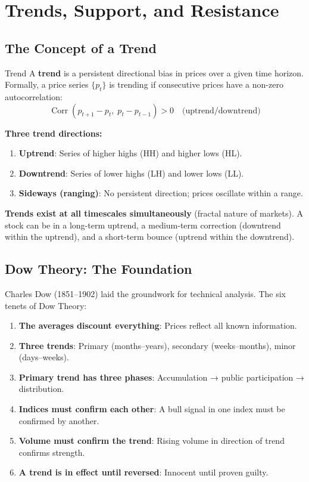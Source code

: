 \documentclass[12pt,a4paper,openany]{report}
\theoremstyle{definition}
\newcommand{\Corr}{\operatorname{Corr}}
\begin{document}

\chapter{Trends, Support, and Resistance}

\section{The Concept of a Trend}

\begin{definitionbox}{Trend}
A \textbf{trend} is a persistent directional bias in prices over a given time horizon. Formally, a price series $\{p_t\}$ is trending if consecutive prices have a non-zero autocorrelation:
\[
  \Corr(p_{t+1} - p_t,\; p_t - p_{t-1}) > 0 \quad \text{(uptrend/downtrend)}
\]
\end{definitionbox}

\noindent\textbf{Three trend directions:}
\begin{enumerate}[label=\arabic*.]
  \item \textbf{Uptrend}: Series of higher highs (HH) and higher lows (HL).
  \item \textbf{Downtrend}: Series of lower highs (LH) and lower lows (LL).
  \item \textbf{Sideways (ranging)}: No persistent direction; prices oscillate within a range.
\end{enumerate}

\textbf{Trends exist at all timescales simultaneously} (fractal nature of markets). A stock can be in a long-term uptrend, a medium-term correction (downtrend within the uptrend), and a short-term bounce (uptrend within the downtrend).

\section{Dow Theory: The Foundation}

Charles Dow (1851--1902) laid the groundwork for technical analysis. The six tenets of Dow Theory:
\begin{enumerate}[label=\arabic*.]
  \item \textbf{The averages discount everything}: Prices reflect all known information.
  \item \textbf{Three trends}: Primary (months--years), secondary (weeks--months), minor (days--weeks).
  \item \textbf{Primary trend has three phases}: Accumulation → public participation → distribution.
  \item \textbf{Indices must confirm each other}: A bull signal in one index must be confirmed by another.
  \item \textbf{Volume must confirm the trend}: Rising volume in direction of trend confirms strength.
  \item \textbf{A trend is in effect until reversed}: Innocent until proven guilty.
\end{enumerate}
\end{document}
